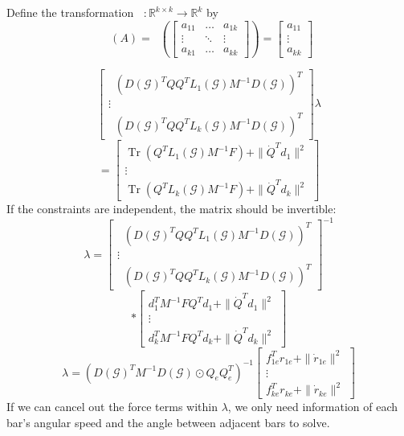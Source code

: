 \documentclass[conference]{IEEEtran}
\DeclareMathOperator{\Tr}{Tr}
\DeclareMathOperator{\Tdiag}{T_{diag}}
\begin{document}
Define the transformation $\Tdiag:\mathbb{R}^{k\times k}\to\mathbb{R}^k$ by
$$\Tdiag(A)=\Tdiag\left(\begin{bmatrix}
    a_{11} & \hdots & a_{1k}\\
    \vdots & \ddots & \vdots\\
    a_{k1} & \hdots & a_{kk}
\end{bmatrix}\right)=\begin{bmatrix}
    a_{11}\\ \vdots\\ a_{kk}
\end{bmatrix}$$

$$\begin{bmatrix}
    \Tdiag(D(\mathcal{G})^TQQ^TL_1(\mathcal{G})M^{-1}D(\mathcal{G}))^T\\
    \vdots\\
    \Tdiag(D(\mathcal{G})^TQQ^TL_k(\mathcal{G})M^{-1}D(\mathcal{G}))^T
\end{bmatrix}\lambda$$
$$=\begin{bmatrix}
    \Tr(Q^TL_1(\mathcal{G})M^{-1}F)+\|\dot{Q}^Td_1\|^2\\
    \vdots\\
    \Tr(Q^TL_k(\mathcal{G})M^{-1}F)+\|\dot{Q}^Td_k\|^2
\end{bmatrix}$$
If the constraints are independent, the matrix should be invertible:
$$\lambda=\begin{bmatrix}
    \Tdiag(D(\mathcal{G})^TQQ^TL_1(\mathcal{G})M^{-1}D(\mathcal{G}))^T\\
    \vdots\\
    \Tdiag(D(\mathcal{G})^TQQ^TL_k(\mathcal{G})M^{-1}D(\mathcal{G}))^T
\end{bmatrix}^{-1}$$
$$*\begin{bmatrix}
    d_1^TM^{-1}FQ^Td_1+\|\dot{Q}^Td_1\|^2\\
    \vdots\\
    d_k^TM^{-1}FQ^Td_k+\|\dot{Q}^Td_k\|^2
\end{bmatrix}$$
$$\lambda=\left(D(\mathcal{G})^TM^{-1}D(\mathcal{G})\odot Q_eQ_e^T\right)^{-1}\begin{bmatrix}
    f_{1e}^Tr_{1e}+\|\dot{r}_{1e}\|^2\\
    \vdots\\
    f_{ke}^Tr_{ke}+\|\dot{r}_{ke}\|^2
\end{bmatrix}$$
If we can cancel out the force terms within $\lambda$, we only need information of each bar's angular speed and the angle between adjacent bars to solve.
\end{document}
